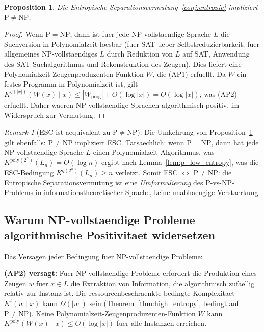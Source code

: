 \documentclass[aps,prd,twocolumn,superscriptaddress,nofootinbib]{revtex4-2}
\newtheorem{proposition}[theorem]{Proposition}
\theoremstyle{definition}
\theoremstyle{remark}
\newtheorem{remark}[theorem]{Remark}
\DeclareMathOperator{\poly}{poly}
\newcommand{\NP}{\mathrm{NP}}
\newcommand{\PP}{\mathrm{P}}
\begin{document}
\begin{proposition}
\label{prop:equiv}
Die Entropische Separationsvermutung~\ref{conj:entropic} impliziert $\PP \neq \NP$.
\end{proposition}

\begin{proof}
Wenn $\PP = \NP$, dann ist fuer jede NP-vollstaendige Sprache $L$ die Suchversion in Polynomialzeit loesbar (fuer SAT ueber Selbstreduzierbarkeit; fuer allgemeines NP-vollstaendiges $L$ durch Reduktion von $L$ auf SAT, Anwendung des SAT-Suchalgorithmus und Rekonstruktion des Zeugen). Dies liefert eine Polynomialzeit-Zeugenproduzenten-Funktion $W$, die (AP1) erfuellt. Da $W$ ein festes Programm in Polynomialzeit ist, gilt $K^{q(|x|)}(W(x) \mid x) \leq |W_{\text{prog}}| + O(\log|x|) = O(\log|x|)$, was (AP2) erfuellt. Daher waeren NP-vollstaendige Sprachen algorithmisch positiv, im Widerspruch zur Vermutung.
\end{proof}

\begin{remark}[ESC ist aequivalent zu $\PP \neq \NP$]
\label{rem:esc-equivalence}
Die Umkehrung von Proposition~\ref{prop:equiv} gilt ebenfalls: $\PP \neq \NP$ impliziert ESC. Tatsaechlich: wenn $\PP = \NP$, dann hat jede NP-vollstaendige Sprache $L$ einen Polynomialzeit-Algorithmus, was $K^{\mathrm{poly}(2^n)}(L_n) = O(\log n)$ ergibt nach Lemma~\ref{lem:p_low_entropy}, was die ESC-Bedingung $K^{q(2^n)}(L_n) \geq n$ verletzt. Somit ESC $\Leftrightarrow$ $\PP \neq \NP$: die Entropische Separationsvermutung ist eine \textit{Umformulierung} des P-vs-NP-Problems in informationstheoretischer Sprache, keine unabhaengige Verstaerkung.
\end{remark}

\subsection{Warum NP-vollstaendige Probleme algorithmische Positivitaet widersetzen}

Das Versagen jeder Bedingung fuer NP-vollstaendige Probleme:

\textbf{(AP2) versagt:} Fuer NP-vollstaendige Probleme erfordert die Produktion eines Zeugen $w$ fuer $x \in L$ die Extraktion von Information, die algorithmisch zufaellig relativ zur Instanz ist. Die ressourcenbeschraenkte bedingte Komplexitaet $K^t(w \mid x)$ kann $\Omega(|w|)$ sein (Theorem~\ref{thm:high_entropy}, bedingt auf $\PP \neq \NP$). Keine Polynomialzeit-Zeugenproduzenten-Funktion $W$ kann $K^{\poly}(W(x) \mid x) \leq O(\log|x|)$ fuer alle Instanzen erreichen.
\end{document}
